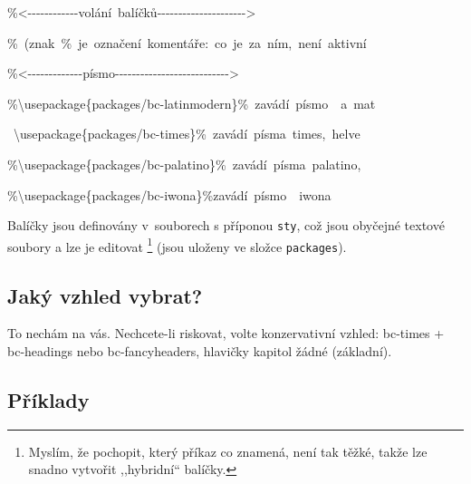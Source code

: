 \begin{lyxcode}
{\footnotesize \%<-{}-{}-{}-{}-{}-{}-{}-{}-{}-{}-{}-volání~balíčků-{}-{}-{}-{}-{}-{}-{}-{}-{}-{}-{}-{}-{}-{}-{}-{}-{}-{}-{}-{}->}{\footnotesize \par}

{\footnotesize \%~(znak~\%~je~označení~komentáře:~co~je~za~ním,~není~aktivní}{\footnotesize \par}

{\footnotesize \%<-{}-{}-{}-{}-{}-{}-{}-{}-{}-{}-{}-{}-písmo-{}-{}-{}-{}-{}-{}-{}-{}-{}-{}-{}-{}-{}-{}-{}-{}-{}-{}-{}-{}-{}-{}-{}-{}-{}-{}->~}{\footnotesize \par}

{\footnotesize \%\textbackslash{}usepackage\{packages/bc-latinmodern\}\%~zavádí~písmo~~a~mat}{\footnotesize \par}

{\footnotesize{}~\textbackslash{}usepackage\{packages/bc-times\}\%~zavádí~písma~times,~helve}{\footnotesize \par}

{\footnotesize \%\textbackslash{}usepackage\{packages/bc-palatino\}\%~zavádí~písma~palatino,~}{\footnotesize \par}

{\footnotesize \%\textbackslash{}usepackage\{packages/bc-iwona\}\%zavádí~písmo~~iwona}{\footnotesize \par}
\end{lyxcode}
Balíčky jsou definovány v~souborech s příponou \texttt{sty}, což
jsou obyčejné textové soubory a lze je editovat%
\footnote{Myslím, že pochopit, který příkaz co znamená, není tak těžké, takže
lze snadno vytvořit ,,hybridní{}`` balíčky.%
} (jsou uloženy ve složce \texttt{packages}).

\begin{lyxcode}

\end{lyxcode}

\subsection{Jaký vzhled vybrat?}

To nechám na vás. Nechcete-li riskovat, volte konzervativní vzhled:
bc-times + bc-headings nebo bc-fancyheaders, hlavičky kapitol žádné
(základní).


\subsection*{Příklady}

